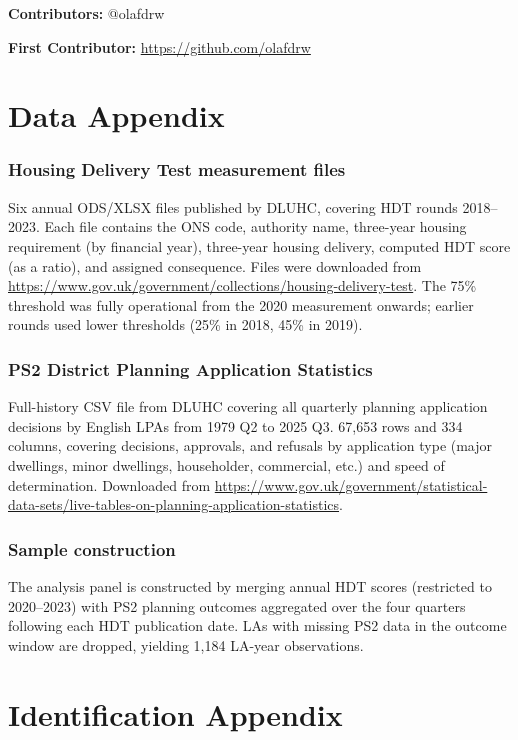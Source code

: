 \documentclass[12pt]{article}
\begin{document}
\noindent\textbf{Contributors:} @olafdrw

\noindent\textbf{First Contributor:} \url{https://github.com/olafdrw}

\label{apep_main_text_end}
\newpage


\newpage
\appendix

\section{Data Appendix}

\subsubsection*{Housing Delivery Test measurement files} Six annual ODS/XLSX files published by DLUHC, covering HDT rounds 2018--2023. Each file contains the ONS code, authority name, three-year housing requirement (by financial year), three-year housing delivery, computed HDT score (as a ratio), and assigned consequence. Files were downloaded from \url{https://www.gov.uk/government/collections/housing-delivery-test}. The 75\% threshold was fully operational from the 2020 measurement onwards; earlier rounds used lower thresholds (25\% in 2018, 45\% in 2019).

\subsubsection*{PS2 District Planning Application Statistics} Full-history CSV file from DLUHC covering all quarterly planning application decisions by English LPAs from 1979 Q2 to 2025 Q3. 67,653 rows and 334 columns, covering decisions, approvals, and refusals by application type (major dwellings, minor dwellings, householder, commercial, etc.) and speed of determination. Downloaded from \url{https://www.gov.uk/government/statistical-data-sets/live-tables-on-planning-application-statistics}.

\subsubsection*{Sample construction} The analysis panel is constructed by merging annual HDT scores (restricted to 2020--2023) with PS2 planning outcomes aggregated over the four quarters following each HDT publication date. LAs with missing PS2 data in the outcome window are dropped, yielding 1,184 LA-year observations.


\section{Identification Appendix}
\end{document}
